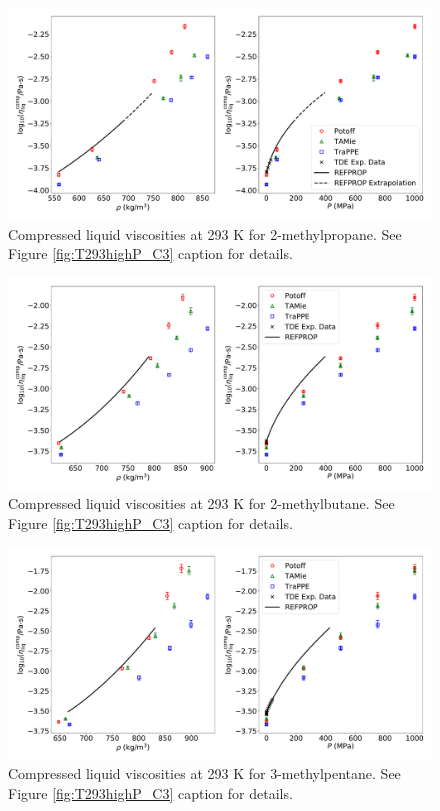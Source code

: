 \documentclass[preprint,review,12pt]{elsarticle}
\begin{document}
	\begin{figure}[htb!]
		\centering
		\includegraphics[width=6.4in]{compare_REFPROP_T293highP_IC4H10.pdf}
		\caption{Compressed liquid viscosities at 293 K for 2-methylpropane. See Figure \ref{fig:T293highP_C3} caption for details.}
		\label{fig:T293highP_IC4}
	\end{figure} 
	
	\begin{figure}[htb!]
		\centering
		\includegraphics[width=6.4in]{compare_REFPROP_T293highP_IC5H12.pdf}
		\caption{Compressed liquid viscosities at 293 K for 2-methylbutane. See Figure \ref{fig:T293highP_C3} caption for details.}
		\label{fig:T293highP_IC5}
	\end{figure} 
	
	\begin{figure}[htb!]
		\centering
		\includegraphics[width=6.4in]{compare_REFPROP_T293highP_3MPentane.pdf}
		\caption{Compressed liquid viscosities at 293 K for 3-methylpentane. See Figure \ref{fig:T293highP_C3} caption for details.}
		\label{fig:T293highP_3MP}
	\end{figure} 
	
\end{document}
